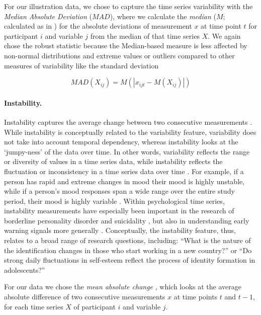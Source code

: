 For our illustration data, we chose to capture the time series
variability with the \textit{Median Absolute Deviation} (\(MAD\)), where
we calculate the \textit{median} (\(M\); calculated as in
) for the absolute deviations of measurement \(x\)
at time point \(t\) for participant \(i\) and variable \(j\) from the
median of that time series \(X\). We again chose the robust statistic
because the Median-based measure is less affected by non-normal
distributions and extreme values or outliers compared to other measures
of variability like the standard deviation \citep{weisberg1992}

\begin{equation} \label{eq:mad}
  MAD(X_{ij}) = M(\left| x_{ijt} - M(X_{ij}) \right|)
\end{equation}

\paragraph{Instability.}

Instability captures the average change between two consecutive
measurements \citep{ebner-priemer2009}. While instability is
conceptually related to the variability feature, variability does not
take into account temporal dependency, whereas instability looks at the
`jumpy-ness' of the data over time. In other words, variability reflects
the range or diversity of values in a time series data, while
instability reflects the fluctuation or inconsistency in a time series
data over time \citep{trull2008}. For example, if a person has rapid and
extreme changes in mood their mood is highly unstable, while if a
person's mood responses span a wide range over the entire study period,
their mood is highly variable \citep{jahng2008}. Within psychological
time series, instability measurements have especially been important in
the research of borderline personality disorder \citep{trull2008} and
suicidality \citep{kivela2022}, but also in understanding early warning
signals more generally \citep{wichers2019}. Conceptually, the
instability feature, thus, relates to a broad range of research
questions, including: ``What is the nature of the identification changes
in those who start working in a new country?'' or ``Do strong daily
fluctuations in self-esteem reflect the process of identity formation in
adolescents?''

For our data we chose the \textit{mean absolute change}
\citep[$MAC$; e.g.,][]{ebner-priemer2009, barandas2020}, which looks at
the average absolute difference of two consecutive measurements \(x\) at
time points \(t\) and \(t-1\), for each time series \(X\) of participant
\(i\) and variable \(j\).

